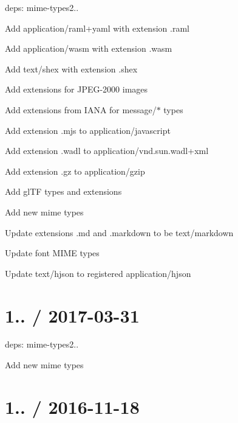 
\begin{DoxyItemize}
\item deps\+: mime-\/types2..
\begin{DoxyItemize}
\item Add {\ttfamily application/raml+yaml} with extension {\ttfamily .raml}
\item Add {\ttfamily application/wasm} with extension {\ttfamily .wasm}
\item Add {\ttfamily text/shex} with extension {\ttfamily .shex}
\item Add extensions for J\+P\+E\+G-\/2000 images
\item Add extensions from I\+A\+NA for {\ttfamily message/$\ast$} types
\item Add extension {\ttfamily .mjs} to {\ttfamily application/javascript}
\item Add extension {\ttfamily .wadl} to {\ttfamily application/vnd.\+sun.\+wadl+xml}
\item Add extension {\ttfamily .gz} to {\ttfamily application/gzip}
\item Add gl\+TF types and extensions
\item Add new mime types
\item Update extensions {\ttfamily .md} and {\ttfamily .markdown} to be {\ttfamily text/markdown}
\item Update font M\+I\+ME types
\item Update {\ttfamily text/hjson} to registered {\ttfamily application/hjson}
\end{DoxyItemize}
\end{DoxyItemize}

\section*{1.. / 2017-\/03-\/31 }


\begin{DoxyItemize}
\item deps\+: mime-\/types2..
\begin{DoxyItemize}
\item Add new mime types
\end{DoxyItemize}
\end{DoxyItemize}

\section*{1.. / 2016-\/11-\/18 }


